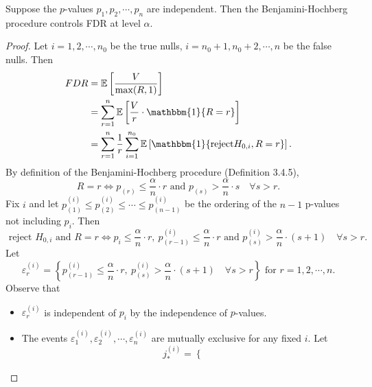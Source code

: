 \documentclass[a4paper]{article}
\begin{document}
\begin{prop}
	Suppose the $p$-values $p_1,p_2,\cdots,p_n$ are independent. Then the Benjamini-Hochberg procedure controls FDR at level $\alpha$.
\end{prop}

\begin{proof}
	Let $i = 1,2, \cdots,n_0$ be the true nulls, $i = n_0+1, n_0+2, \cdots, n$ be the false nulls. Then
	\begin{equation*}
		\begin{aligned}
			FDR &= \mathbb{E}\left[\frac{V}{\max(R,1)}\right] \\
			&= \sum\limits_{r=1}^n \mathbb{E}\left[\frac{V}{r} \cdot \mathbbm{1}\{R=r\}\right] \\
			&= \sum\limits_{r=1}^n \frac{1}{r} \sum\limits_{i=1}^{n_0} \mathbb{E} \left[\mathbbm{1}\{\text{reject} H_{0,i}, R = r\}\right].
		\end{aligned}
	\end{equation*}
	By definition of the Benjamini-Hochberg procedure (Definition 3.4.5),
	\begin{equation*}
		R = r \iff p_{(r)} \leq \frac{\alpha}{n} \cdot r \text{ and } p_{(s)} > \frac{\alpha}{n} \cdot s \quad \forall s > r.
	\end{equation*}
	Fix $i$ and let $p_{(1)}^{(i)} \leq p_{(2)}^{(i)} \leq \cdots \leq p_{(n-1)}^{(i)}$ be the ordering of the $n-1$ p-values not including $p_i$. Then
	\begin{equation*}
		\text{ reject } H_{0,i} \text{ and } R = r \iff p_i \leq \frac{\alpha}{n} \cdot r, \ p_{(r-1)}^{(i)} \leq \frac{\alpha}{n} \cdot r \text{ and } p_{(s)}^{(i)} > \frac{\alpha}{n} \cdot (s+1) \quad \forall s > r.
	\end{equation*}
	Let
	\begin{equation*}
		\varepsilon_r^{(i)} = \left\{p_{(r-1)}^{(i)} \leq \frac{\alpha}{n} \cdot r, \ p_{(s)}^{(i)} > \frac{\alpha}{n} \cdot (s+1) \quad \forall s > r\right\} \text{ for } r = 1,2, \cdots,n.
	\end{equation*}
	Observe that
	\begin{itemize}
		\item $\varepsilon_r^{(i)}$ is independent of $p_i$ by the independence of $p$-values.
		\item The events $\varepsilon_1^{(i)},\varepsilon_2^{(i)},\cdots,\varepsilon_n^{(i)}$ are mutually exclusive for any fixed $i$. Let
		\begin{equation*}
			j_{*}^{(i)} = \left\{
			\begin{array}{ll}

\end{array}
\end{equation*}
\end{itemize}
\end{proof}
\end{document}
